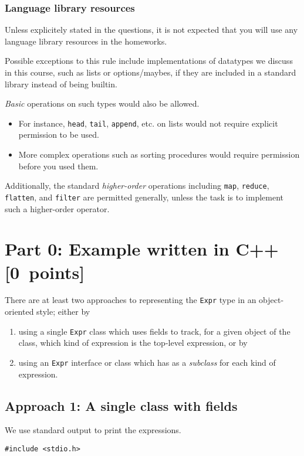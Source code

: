 \documentclass[11pt]{article}
\begin{document}
\subsubsection*{Language library resources}
\label{sec:org2c1f0dd}

Unless explicitely stated in the questions,
it is not expected that you will use any language library resources
in the homeworks.

Possible exceptions to this rule include implementations
of datatypes we discuss in this course, such as lists
or options/maybes, if they are included in a standard library
instead of being builtin.

\emph{Basic} operations on such types would also be allowed.
\begin{itemize}
\item For instance, \texttt{head}, \texttt{tail}, \texttt{append}, etc. on lists
would not require explicit permission to be used.
\item More complex operations such as sorting procedures
would require permission before you used them.
\end{itemize}

Additionally, the standard \emph{higher-order} operations
including \texttt{map}, \texttt{reduce}, \texttt{flatten}, and \texttt{filter} are permitted generally,
unless the task is to implement such a higher-order operator.

\section*{Part 0: Example written in C++                   [0 points]}
\label{sec:org6055041}
There are at least two approaches to representing the \texttt{Expr} type
in an object-oriented style;
either by
\begin{enumerate}
\item using a single \texttt{Expr} class which uses fields to track,
for a given object of the class,
which kind of expression is the top-level expression, or by
\item using an \texttt{Expr} interface or class which has as a \emph{subclass} for
each kind of expression.
\end{enumerate}

\subsection*{Approach 1: A single class with fields}
\label{sec:orga7349cf}
We use standard output to print the expressions.
\begin{verbatim}
#include <stdio.h>
\end{verbatim}
\end{document}
